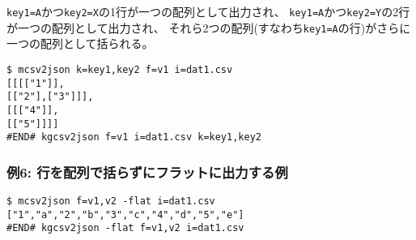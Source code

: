 \verb|key1=A|かつ\verb|key2=X|の1行が一つの配列として出力され、
\verb|key1=A|かつ\verb|key2=Y|の2行が一つの配列として出力され、
それら2つの配列(すなわち\verb|key1=A|の行)がさらに一つの配列として括られる。


\begin{Verbatim}[baselinestretch=0.7,frame=single]
$ mcsv2json k=key1,key2 f=v1 i=dat1.csv
[[[["1"]],
[["2"],["3"]]],
[[["4"]],
[["5"]]]]
#END# kgcsv2json f=v1 i=dat1.csv k=key1,key2
\end{Verbatim}
\subsubsection*{例6: 行を配列で括らずにフラットに出力する例}



\begin{Verbatim}[baselinestretch=0.7,frame=single]
$ mcsv2json f=v1,v2 -flat i=dat1.csv
["1","a","2","b","3","c","4","d","5","e"]
#END# kgcsv2json -flat f=v1,v2 i=dat1.csv
\end{Verbatim}
